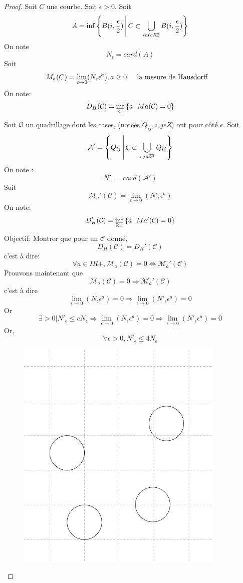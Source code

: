 \begin{proof}
Soit $C$ une courbe. 
Soit $\epsilon>0$.
Soit \[A=\inf \left\{B(i, \frac{\epsilon}{2})\,\middle|\,C\subset \bigcup_{icIcR2} B(i, \frac{\epsilon}{2})\right\}\]
On note \[N_\epsilon =card(A)\]
Soit \[M_a (C)=\lim\limits_{\epsilon\rightarrow0}(N_\epsilon\epsilon^{a}), a\geq0, \quad \text{la mesure de Hausdorff} \quad\]
On note: \[D_{H}(\mathcal{C})=\inf_{\mathbb{R}_{+}} \left\{a\,\middle|\,Ma(\mathcal{C})=0\right\}\]
Soit $\mathcal{Q}$ un quadrillage dont les cases, (notées $Q_{ij}, i,j e Z$) ont pour côté $\epsilon$.
Soit \[\mathcal{A'}= \left\{Q_{ij}\,\middle|\,\mathcal{C}\subset \bigcup_{i,j e Z^{2}}Q_{ij}\right\}\]
On note : \[N'_{\epsilon}=card(\mathcal{A'})\]
Soit \[\mathcal{M}_{a}'(\mathcal{C})=\lim\limits_{\epsilon\rightarrow0}(N'_\epsilon\epsilon^{a})\]
On note: \[D_{H}'(\mathcal{C})=\inf_{\mathbb{R}_{+}} \left\{a\,\middle|\,Ma'(\mathcal{C})=0\right\}\]
Objectif: Montrer que pour un $\mathcal{C}$ donné, \[D_{H}(\mathcal{C})=D_{H}'(\mathcal{C})\]
c'est à dire:\[\forall a \in IR+, \mathcal{M}_{a}(\mathcal{C})=0\Leftrightarrow \mathcal{M}_{a}'(\mathcal{C})\]
Prouvons maintenant que \[\mathcal{M}_{a}(\mathcal{C})=0 \Rightarrow \mathcal{M}_{a}'(\mathcal{C}) \]
c'est à dire \[\lim\limits_{\epsilon\rightarrow0}(N_\epsilon\epsilon^{a})=0 \Rightarrow \lim\limits_{\epsilon\rightarrow0}(N'_\epsilon\epsilon^{a})=0\]
Or \[\exists>0 | N'_{\epsilon} \leq cN_{\epsilon} \Rightarrow \lim\limits_{\epsilon\rightarrow0}(N_\epsilon\epsilon^{a})=0 \Rightarrow \lim\limits_{\epsilon\rightarrow0}(N'_\epsilon\epsilon^{a})=0\]
Or, \[\forall\epsilon > 0, N'_{\epsilon} \leq 4N_{\epsilon}\]
\begin{figure}[h]
\includegraphics[width=10cm]{cases.png}

\end{figure}
\end{proof}
